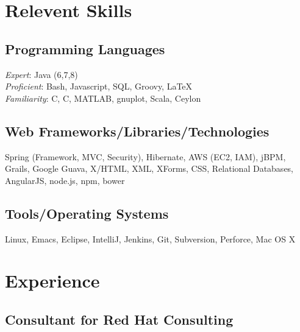 \documentclass[a4paper,11pt]{article}
\newcommand{\CC}{C\nolinebreak\hspace{-.05em}\raisebox{.4ex}{\tiny\bf
    +}\nolinebreak\hspace{-.10em}\raisebox{.4ex}{\tiny\bf +}}
\def\CC{{C\nolinebreak[4]\hspace{-.05em}\raisebox{.4ex}{\tiny\bf ++}}}
\begin{document}

  \section*{Relevent Skills}

  \begin{multicols}{2}
    \raggedright

    \subsection*{Programming Languages}

    \textsl{Expert}: Java (6,7,8) \\
    \textsl{Proficient}: Bash, Javascript, SQL, Groovy, \LaTeX \\
    \textsl{Familiarity}: C, \CC, MATLAB, gnuplot, Scala, Ceylon

    \subsection*{Web Frameworks/Libraries/Technologies}

    Spring (Framework, MVC, Security), Hibernate, AWS (EC2, IAM), jBPM, Grails, Google Guava,
    X/HTML, XML, XForms, CSS, Relational Databases, AngularJS, node.js, npm, bower
    
    \subsection*{Tools/Operating Systems}

    Linux, Emacs, Eclipse, IntelliJ, Jenkins, Git, Subversion, Perforce, Mac OS
    X
    
  \end{multicols}
  

\section*{Experience}

\subsection*{Consultant for Red Hat Consulting}
\end{document}
